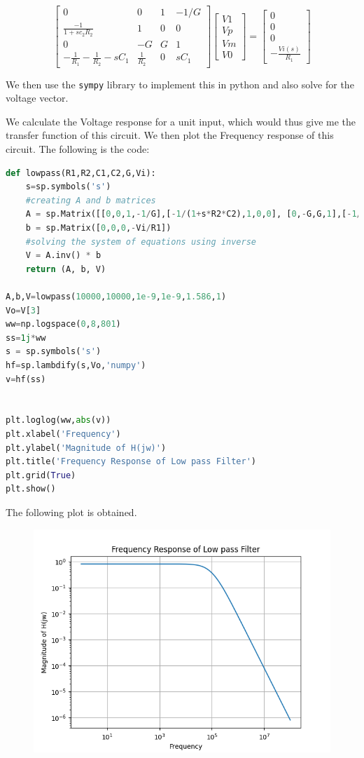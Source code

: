\documentclass[11pt, a4paper]{article}
\begin{document}
\[
\begin{bmatrix}
0 & 0 & 1 & -1/G\\
\frac{-1}{1+sc_2R_2} & 1 & 0 & 0\\
0 & -G & G & 1\\
-\frac{1}{R_1} -\frac{1}{R_2} - sC_1 & \frac{1}{R_2} & 0 & sC_1
\end{bmatrix}
\begin{bmatrix}
V1\\
Vp\\
Vm\\
V0
\end{bmatrix}
=
\begin{bmatrix}
0\\
0\\
0\\
-\frac{Vi(s)}{R_1}
\end{bmatrix}
\]

We then use the \texttt{sympy} library to implement this in python and also solve for the voltage vector.

We calculate the Voltage response for a unit input, which would thus give me the transfer function of this circuit. We then plot the Frequency response of this circuit. The following is the code:\\

\begin{lstlisting}[language = Python]
def lowpass(R1,R2,C1,C2,G,Vi):
    s=sp.symbols('s')
    #creating A and b matrices
    A = sp.Matrix([[0,0,1,-1/G],[-1/(1+s*R2*C2),1,0,0], [0,-G,G,1],[-1/R1-1/R2-s*C1,1/R2,0,s*C1]])
    b = sp.Matrix([0,0,0,-Vi/R1])
    #solving the system of equations using inverse
    V = A.inv() * b
    return (A, b, V)

A,b,V=lowpass(10000,10000,1e-9,1e-9,1.586,1) 
Vo=V[3] 
ww=np.logspace(0,8,801)
ss=1j*ww
s = sp.symbols('s')
hf=sp.lambdify(s,Vo,'numpy')
v=hf(ss)


plt.loglog(ww,abs(v))
plt.xlabel('Frequency')
plt.ylabel('Magnitude of H(jw)')
plt.title('Frequency Response of Low pass Filter')
plt.grid(True)
plt.show()
\end{lstlisting}
The following plot is obtained.

\begin{figure}[H]
     \centering
     \includegraphics[scale=0.8]{Figure_1.png}
\end{figure}
\end{document}
